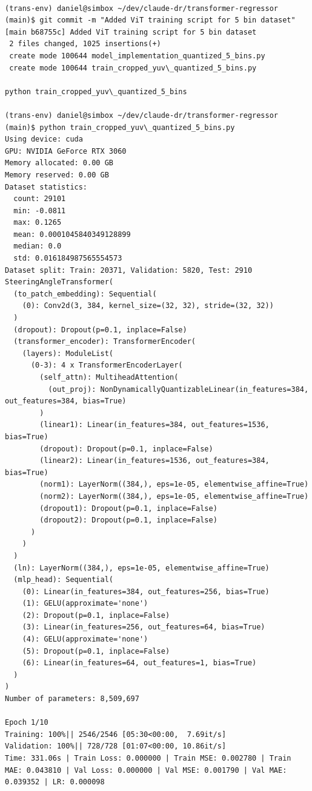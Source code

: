 \begin{verbatim}

(trans-env) daniel@simbox ~/dev/claude-dr/transformer-regressor (main)$ git commit -m "Added ViT training script for 5 bin dataset"
[main b68755c] Added ViT training script for 5 bin dataset
 2 files changed, 1025 insertions(+)
 create mode 100644 model_implementation_quantized_5_bins.py
 create mode 100644 train_cropped_yuv\_quantized_5_bins.py

python train_cropped_yuv\_quantized_5_bins

(trans-env) daniel@simbox ~/dev/claude-dr/transformer-regressor (main)$ python train_cropped_yuv\_quantized_5_bins.py
Using device: cuda
GPU: NVIDIA GeForce RTX 3060
Memory allocated: 0.00 GB
Memory reserved: 0.00 GB
Dataset statistics:
  count: 29101
  min: -0.0811
  max: 0.1265
  mean: 0.0001045840349128899
  median: 0.0
  std: 0.016184987565554573
Dataset split: Train: 20371, Validation: 5820, Test: 2910
SteeringAngleTransformer(
  (to_patch_embedding): Sequential(
    (0): Conv2d(3, 384, kernel_size=(32, 32), stride=(32, 32))
  )
  (dropout): Dropout(p=0.1, inplace=False)
  (transformer_encoder): TransformerEncoder(
    (layers): ModuleList(
      (0-3): 4 x TransformerEncoderLayer(
        (self_attn): MultiheadAttention(
          (out_proj): NonDynamicallyQuantizableLinear(in_features=384, out_features=384, bias=True)
        )
        (linear1): Linear(in_features=384, out_features=1536, bias=True)
        (dropout): Dropout(p=0.1, inplace=False)
        (linear2): Linear(in_features=1536, out_features=384, bias=True)
        (norm1): LayerNorm((384,), eps=1e-05, elementwise_affine=True)
        (norm2): LayerNorm((384,), eps=1e-05, elementwise_affine=True)
        (dropout1): Dropout(p=0.1, inplace=False)
        (dropout2): Dropout(p=0.1, inplace=False)
      )
    )
  )
  (ln): LayerNorm((384,), eps=1e-05, elementwise_affine=True)
  (mlp_head): Sequential(
    (0): Linear(in_features=384, out_features=256, bias=True)
    (1): GELU(approximate='none')
    (2): Dropout(p=0.1, inplace=False)
    (3): Linear(in_features=256, out_features=64, bias=True)
    (4): GELU(approximate='none')
    (5): Dropout(p=0.1, inplace=False)
    (6): Linear(in_features=64, out_features=1, bias=True)
  )
)
Number of parameters: 8,509,697

Epoch 1/10
Training: 100%|| 2546/2546 [05:30<00:00,  7.69it/s]
Validation: 100%|| 728/728 [01:07<00:00, 10.86it/s]
Time: 331.06s | Train Loss: 0.000000 | Train MSE: 0.002780 | Train MAE: 0.043810 | Val Loss: 0.000000 | Val MSE: 0.001790 | Val MAE: 0.039352 | LR: 0.000098


\end{verbatim}
